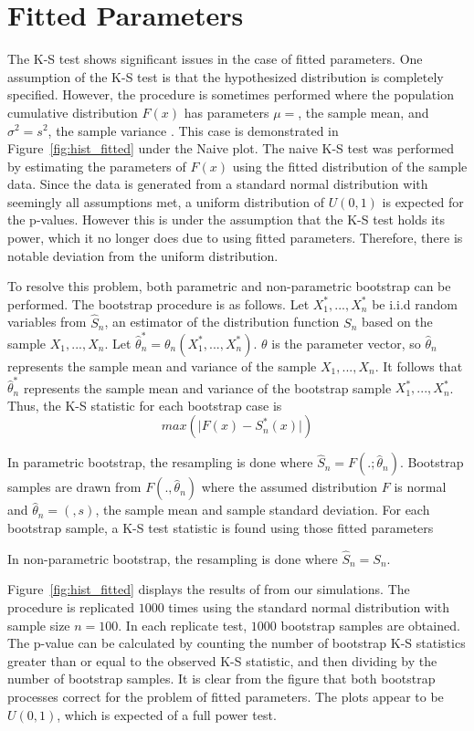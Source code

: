 \documentclass[12pt, letterpaper, titlepage]{article}
\makeatletter
\newcommand*{\Xbar}{}%
\DeclareRobustCommand*{\Xbar}{%
  \mathpalette\@Xbar{}%
}
\newcommand*{\@Xbar}[2]{%
  \sbox0{$#1\mathrm{X}\m@th$}%
  \sbox2{$#1X\m@th$}%
  \rlap{%
    \hbox to\wd2{%
      \hfill
      $\overline{%
        \vrule width 0pt height\ht0 %
        \kern\wd0 %
      }$%
    }%
  }%
  \copy2 %
}
\makeatother
\begin{document}
\hypertarget{sec:fitted}{%
\section{Fitted Parameters}\label{sec:fitted}}

The K-S test shows significant issues in the case of fitted parameters. One assumption 
of the K-S test is that the hypothesized distribution is completely specified. 
However, the procedure is sometimes performed where the population cumulative 
distribution $F(x)$ has parameters $\mu=\Xbar$, the sample mean, and $\sigma^2=s^2$, 
the sample variance \citep{Lilliefors}. This case is demonstrated in Figure~\ref{fig:hist_fitted} 
under the Naive plot. The naive K-S test was performed by estimating the parameters 
of $F(x)$ using the fitted distribution of the sample data. Since the data is generated 
from a standard normal distribution with seemingly all assumptions met, a uniform 
distribution of $U(0,1)$ is expected for the p-values. However this is under the 
assumption that the K-S test holds its power, which it no longer does due to using 
fitted parameters. Therefore, there is notable deviation from the uniform distribution. 

To resolve this problem, both parametric and non-parametric bootstrap can be performed. 
The bootstrap procedure is as follows. Let $X_1^*,...,X_n^*$ be i.i.d random variables from $\hat{S}_n$, an estimator of the distribution function $S_n$ based on the sample $X_1,...,X_n$. Let $\hat{\theta}_n^* = \theta_n(X_1^*,...,X_n^*)$. $\theta$ is the parameter vector, so $\hat{\theta}_n$ represents the sample mean and variance of the sample $X_1,...,X_n$. It follows that $\hat{\theta}_n^*$ represents the sample mean and variance of the bootstrap sample $X_1^*,...,X_n^*$. Thus, the K-S statistic for each bootstrap case is \[max(\lvert F(x)-S^*_n(x) \rvert)\]

In parametric bootstrap, the resampling is done where $\hat{S}_n = F(.;\hat{\theta}_n)$. Bootstrap samples are drawn from ${F}(.,\hat{\theta}_n)$ where the assumed distribution $F$ is normal and $\hat{\theta}_n = (\Xbar, s)$, the sample mean and sample standard deviation. For each bootstrap sample, a K-S test statistic is found using those fitted parameters

In non-parametric bootstrap, the resampling is done where $\hat{S}_n = S_n$.

Figure~\ref{fig:hist_fitted} displays the results of from our simulations. The procedure 
is replicated $1000$ times using the standard normal distribution with sample size $n=100$. 
In each replicate test, $1000$ bootstrap samples are obtained. The p-value can be calculated
by counting the number of bootstrap K-S statistics greater than or equal to the observed K-S statistic, 
and then dividing by the number of bootstrap samples. It is clear from the figure that both
bootstrap processes correct for the problem of fitted parameters. The plots appear to be
$U(0,1)$, which is expected of a full power test.
\end{document}
